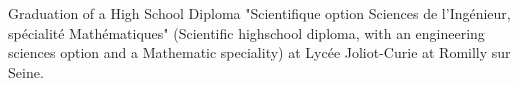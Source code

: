 \begin{rubric}{
}
\entry*[2005]
Graduation of a High School Diploma "Scientifique option Sciences de l'Ingénieur, spécialité Mathématiques" (Scientific highschool diploma, with an engineering sciences option and a Mathematic speciality) at Lycée Joliot-Curie at Romilly sur Seine.









\end{rubric}

